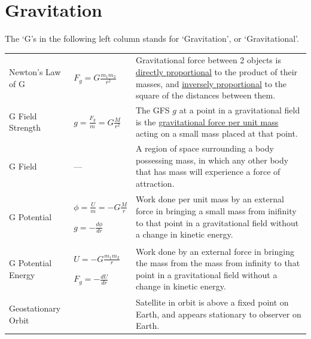 \documentclass[a4paper,11pt]{article}
\begin{document}
	\section{Gravitation}
	The `G's in the following left column stands for `Gravitation', or `Gravitational'.
		\begin{center}
			\renewcommand{\arraystretch}{1.5}
			\begin{tabular}{@{} l l p{8cm} @{}}
				\toprule
				Newton's Law of G & $\displaystyle F_g = G\frac{m_1 m_2}{r^2}$ & Gravitational force between 2 objects is \underline{directly proportional} to the product of their masses, and \underline{inversely proportional} to the square of the distances between them. \\
				G Field Strength & $\displaystyle g = \frac{F_g}{m} = G\frac{M}{r^2}$ & The GFS $g$ at a point in a gravitational field is the \underline{gravitational force per unit mass} acting on a small mass placed at that point. \\
				G Field & --- & A region of space surrounding a body possessing mass, in which any other body that has mass will experience a force of attraction.\\
				G Potential & \multicolumn{1}{p{2.6cm}}{$\displaystyle \phi = \frac{U}{m} = -G \frac{M}{r}$ \par \vspace{1.5mm} $\displaystyle g=-\frac{d\phi}{dr}$\vspace{1.5mm}} & Work done per unit mass by an external force in bringing a small mass from inifinity to that point in a gravitational field without a change in kinetic energy.\\
				G Potential Energy & \multicolumn{1}{p{2.6cm}}{$\displaystyle U = -G \frac{m_1 m_2}{r}$ \par \vspace{2mm} $\displaystyle F_g=-\frac{dU}{dr}$} & Work done by an external force in bringing the mass from the mass from infinity to that point in a gravitational field without a change in kinetic energy. \\
				Geostationary Orbit & & Satellite in orbit is above a fixed point on Earth, and appears stationary to observer on Earth. \\
				\bottomrule
			\end{tabular}
		\end{center}
\end{document}

